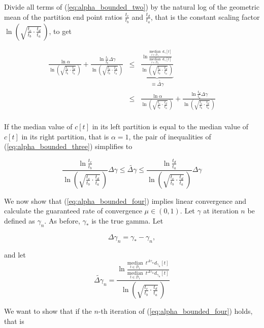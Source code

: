 \documentclass{segabs}
\newcommand{\truegamma}{\gamma_*}
\newcommand{\deltagamma}{{\Delta\gamma}}
\newcommand{\deltagammaguess}{{\widetilde{\deltagamma}}}
\newcommand{\Done}{{\mathcal{D}_1}}
\newcommand{\Dtwo}{{\mathcal{D}_2}}
\newcommand{\undermedian}[2]{\underset{#1}{\text{median}}\,\,\,#2}
\newcommand{\scalefactor}{\ln \left(\sqrt{\frac{t_c}{t_b}\cdot\frac{t_d}{t_a}} \,\right) }
\begin{document}
Divide all terms of (\ref{eq:alpha_bounded_two}) by the natural log of the geometric mean of the partition end point ratios $\frac{t_c}{t_b}$ and $\frac{t_d}{t_a}$, that is the constant scaling factor $\scalefactor$, to get

\begin{eqnarray}
\label{eq:alpha_bounded_three}
\frac{\ln \alpha}{\scalefactor} + \frac{\ln \frac{t_c}{t_b}\deltagamma }{\scalefactor} & \leq & \underbrace{ \frac{\ln \frac{\undermedian{t \in \Done}{ d_\gamma[t]}}{\undermedian{t \in \Dtwo}{ d_\gamma[t]}} }{\scalefactor}}_{\equiv \deltagammaguess} \nonumber \\ 
& \leq & \frac{\ln \alpha}{\scalefactor} + \frac{\ln \frac{t_d}{t_a}\deltagamma }{\scalefactor} \nonumber \\
\end{eqnarray}

If the median value of $c[t]$ in its left partition is equal to the median value of $c[t]$ in its right partition, that is $\alpha=1$, the pair of inequalities of (\ref{eq:alpha_bounded_three}) simplifies to 

\begin{equation}
\label{eq:alpha_bounded_four}
 \frac{\ln\frac{t_c}{t_b}}{\scalefactor} \deltagamma \leq \deltagammaguess \leq \frac{\ln\frac{t_d}{t_a}}{\scalefactor} \deltagamma
\end{equation}


We now show that (\ref{eq:alpha_bounded_four}) implies linear convergence and calculate the guaranteed rate of convergence $\mu \in (0,1)$.  Let $\gamma$ at iteration $n$ be defined as $\gamma_n$. As before, $\truegamma$ is the true gamma.  Let

\begin{equation}
\deltagamma_n =\truegamma - \gamma_n,
\end{equation}

and let
\begin{equation}
\deltagammaguess_n = \frac{\ln \frac{\undermedian{t \in \Done}{t^{\deltagamma_n} d_{\gamma_n}[t]}}{\undermedian{t \in \Done}{t^{\deltagamma_n} d_{\gamma_n}[t]}} }{\scalefactor}
\end{equation}

We want to show that if the $n$-th iteration of (\ref{eq:alpha_bounded_four}) holds, that is  
\end{document}
